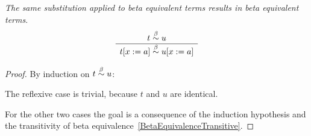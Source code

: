 \begin{theorem}
    \label{SubstituteEquivalence}
    \emph{The same substitution applied to beta equivalent terms results in beta
    equivalent terms}.
    $$
    \begin{array}{c} 
        t \stackrel{\beta}{\sim} u
     \\ \hline 
        t[x:=a] \stackrel{\beta}{\sim} u[x:=a]
    \end{array}
    $$

    \begin{proof}
        By induction on $t \stackrel{\beta}{\sim} u$:

        The reflexive case is trivial, because $t$ and $u$ are identical.

        For the other two cases the goal is a consequence of the induction
        hypothesis and the transitivity of beta
        equivalence~\ref{BetaEquivalenceTransitive}.
    \end{proof}
\end{theorem}
